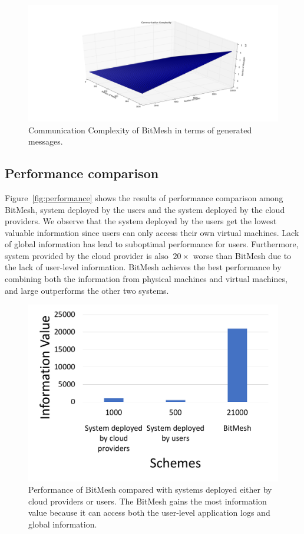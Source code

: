 \documentclass[11px]{article}
\newcommand{\projTitle}{BitMesh\xspace}
\begin{document}
\begin{figure}[h]
\centering
\includegraphics[width=0.8\linewidth]{figures/complexity_of_communication.png}
\caption{Communication Complexity of \projTitle in terms of generated messages.}
\label{fig:complexity_measure}
\center
\end{figure}

\subsection{Performance comparison}
Figure~\ref{fig:performance} shows the results of performance comparison among \projTitle, system deployed by the users and the system deployed by the cloud providers. We observe that the system deployed by the users get the lowest valuable information since users can only access their own virtual machines. Lack of global information has lead to suboptimal performance for users. Furthermore, system provided by the cloud provider is also $~20\times$ worse than \projTitle due to the lack of user-level information. \projTitle achieves the best performance by combining both the information from physical machines and virtual machines, and large outperforms the other two systems.

\label{ssec:eval_performance}
\begin{figure}[h]
\label{fig:performance}
\center
\includegraphics[width=0.6\linewidth]{figures/peformance.pdf}
\caption{Performance of \projTitle compared with systems deployed either by cloud providers or users. The \projTitle gains the most information value because it can access both the user-level application logs and global information.}
\label{fig:miner_work_flow}
\end{figure}
\end{document}

